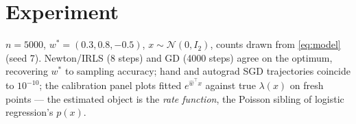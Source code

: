 \documentclass[11pt]{article}
\begin{document}
\section{Experiment}

$n = 5000$, $w^\ast = (0.3, 0.8, -0.5)$, $x \sim \mathcal{N}(0, I_2)$,
counts drawn from \eqref{eq:model} (seed 7). Newton/IRLS (8 steps) and GD
(4000 steps) agree on the optimum, recovering $w^\ast$ to sampling
accuracy; hand and autograd SGD trajectories coincide to $10^{-10}$; the
calibration panel plots fitted $e^{\hat w^\top x}$ against true
$\lambda(x)$ on fresh points --- the estimated object is the \emph{rate
function}, the Poisson sibling of logistic regression's $p(x)$.
\end{document}
